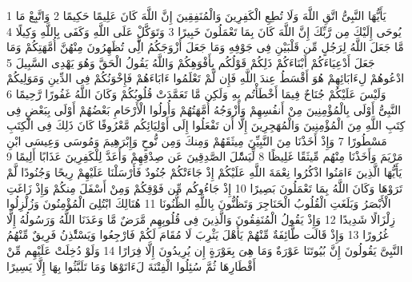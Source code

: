 \documentclass[20pt,a4paper]{article}
\title{}
\author{}
\date{}
\begin{document}
\pagecolor{cl_page}



{\tiny\colorbox{cl_aya}{1}} يَأَيُّهَا النَّبِىُّ اتَّقِ اللَّهَ وَلَا تُطِعِ الْكَفِرِينَ وَالْمُنَفِقِينَ إِنَّ اللَّهَ كَانَ عَلِيمًا حَكِيمًا
{\tiny\colorbox{cl_aya}{2}} وَاتَّبِعْ مَا يُوحَى إِلَيْكَ مِن رَّبِّكَ إِنَّ اللَّهَ كَانَ بِمَا تَعْمَلُونَ خَبِيرًا
{\tiny\colorbox{cl_aya}{3}} وَتَوَكَّلْ عَلَى اللَّهِ وَكَفَى بِاللَّهِ وَكِيلًا
{\tiny\colorbox{cl_aya}{4}} مَّا جَعَلَ اللَّهُ لِرَجُلٍ مِّن قَلْبَيْنِ فِى جَوْفِهِ وَمَا جَعَلَ أَزْوَجَكُمُ الَِّٔى تُظَهِرُونَ مِنْهُنَّ أُمَّهَتِكُمْ وَمَا جَعَلَ أَدْعِيَاءَكُمْ أَبْنَاءَكُمْ ذَلِكُمْ قَوْلُكُم بِأَفْوَهِكُمْ وَاللَّهُ يَقُولُ الْحَقَّ وَهُوَ يَهْدِى السَّبِيلَ
{\tiny\colorbox{cl_aya}{5}} ادْعُوهُمْ لِءَابَائِهِمْ هُوَ أَقْسَطُ عِندَ اللَّهِ فَإِن لَّمْ تَعْلَمُوا ءَابَاءَهُمْ فَإِخْوَنُكُمْ فِى الدِّينِ وَمَوَلِيكُمْ وَلَيْسَ عَلَيْكُمْ جُنَاحٌ فِيمَا أَخْطَأْتُم بِهِ وَلَكِن مَّا تَعَمَّدَتْ قُلُوبُكُمْ وَكَانَ اللَّهُ غَفُورًا رَّحِيمًا
{\tiny\colorbox{cl_aya}{6}} النَّبِىُّ أَوْلَى بِالْمُؤْمِنِينَ مِنْ أَنفُسِهِمْ وَأَزْوَجُهُ أُمَّهَتُهُمْ وَأُولُوا الْأَرْحَامِ بَعْضُهُمْ أَوْلَى بِبَعْضٍ فِى كِتَبِ اللَّهِ مِنَ الْمُؤْمِنِينَ وَالْمُهَجِرِينَ إِلَّا أَن تَفْعَلُوا إِلَى أَوْلِيَائِكُم مَّعْرُوفًا كَانَ ذَلِكَ فِى الْكِتَبِ مَسْطُورًا
{\tiny\colorbox{cl_aya}{7}} وَإِذْ أَخَذْنَا مِنَ النَّبِيِّنَ مِيثَقَهُمْ وَمِنكَ وَمِن نُّوحٍ وَإِبْرَهِيمَ وَمُوسَى وَعِيسَى ابْنِ مَرْيَمَ وَأَخَذْنَا مِنْهُم مِّيثَقًا غَلِيظًا
{\tiny\colorbox{cl_aya}{8}} لِّيَسَْٔلَ الصَّدِقِينَ عَن صِدْقِهِمْ وَأَعَدَّ لِلْكَفِرِينَ عَذَابًا أَلِيمًا
{\tiny\colorbox{cl_aya}{9}} يَأَيُّهَا الَّذِينَ ءَامَنُوا اذْكُرُوا نِعْمَةَ اللَّهِ عَلَيْكُمْ إِذْ جَاءَتْكُمْ جُنُودٌ فَأَرْسَلْنَا عَلَيْهِمْ رِيحًا وَجُنُودًا لَّمْ تَرَوْهَا وَكَانَ اللَّهُ بِمَا تَعْمَلُونَ بَصِيرًا
{\tiny\colorbox{cl_aya}{10}} إِذْ جَاءُوكُم مِّن فَوْقِكُمْ وَمِنْ أَسْفَلَ مِنكُمْ وَإِذْ زَاغَتِ الْأَبْصَرُ وَبَلَغَتِ الْقُلُوبُ الْحَنَاجِرَ وَتَظُنُّونَ بِاللَّهِ الظُّنُونَا
{\tiny\colorbox{cl_aya}{11}} هُنَالِكَ ابْتُلِىَ الْمُؤْمِنُونَ وَزُلْزِلُوا زِلْزَالًا شَدِيدًا
{\tiny\colorbox{cl_aya}{12}} وَإِذْ يَقُولُ الْمُنَفِقُونَ وَالَّذِينَ فِى قُلُوبِهِم مَّرَضٌ مَّا وَعَدَنَا اللَّهُ وَرَسُولُهُ إِلَّا غُرُورًا
{\tiny\colorbox{cl_aya}{13}} وَإِذْ قَالَت طَّائِفَةٌ مِّنْهُمْ يَأَهْلَ يَثْرِبَ لَا مُقَامَ لَكُمْ فَارْجِعُوا وَيَسْتَْٔذِنُ فَرِيقٌ مِّنْهُمُ النَّبِىَّ يَقُولُونَ إِنَّ بُيُوتَنَا عَوْرَةٌ وَمَا هِىَ بِعَوْرَةٍ إِن يُرِيدُونَ إِلَّا فِرَارًا
{\tiny\colorbox{cl_aya}{14}} وَلَوْ دُخِلَتْ عَلَيْهِم مِّنْ أَقْطَارِهَا ثُمَّ سُئِلُوا الْفِتْنَةَ لَءَاتَوْهَا وَمَا تَلَبَّثُوا بِهَا إِلَّا يَسِيرًا
\end{document}

